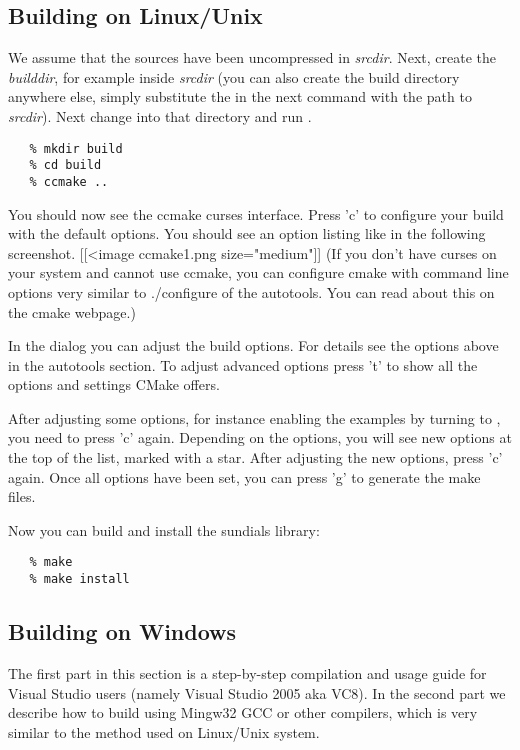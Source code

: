 \subsection{Building on Linux/Unix}

We assume that the {\sundials} sources have been uncompressed in {\em srcdir}. Next, create the {\em builddir}, for example
inside {\em srcdir} (you can also create the build directory anywhere else, simply substitute the  in the next command
with the path to {\em srcdir}). Next change into that directory and run .
\begin{verbatim}
   % mkdir build
   % cd build
   % ccmake ..
\end{verbatim}
You should now see the ccmake curses interface. Press 'c' to configure your build with the default
options. You should see an option listing like in the following screenshot.
[[<image ccmake1.png size="medium"]]
(If you don't have curses on your system and cannot use ccmake, you can configure cmake with
command line options very similar to ./configure of the autotools. You can read about this on
the cmake webpage.)

In the dialog you can adjust the build options. For details see the options above
in the autotools section. To adjust advanced options press 't' to show all the options
and settings CMake offers. 

After adjusting some options, for instance enabling the examples by turning 
 to , you need to press 'c' again. Depending on the options, 
you will see new options at the top of the list, marked with a star. After adjusting the 
new options, press 'c' again. Once all options have been set, you can press 'g' to generate 
the make files.

Now you can build and install the sundials library:
\begin{verbatim}
   % make
   % make install
\end{verbatim}

\subsection{Building on Windows}

The first part in this section is a step-by-step compilation and usage guide for Visual Studio 
users (namely Visual Studio 2005 aka VC8). In the second part we describe how to build 
{\sundials} using Mingw32 GCC or other compilers, which is very similar to the method used 
on Linux/Unix system. 

